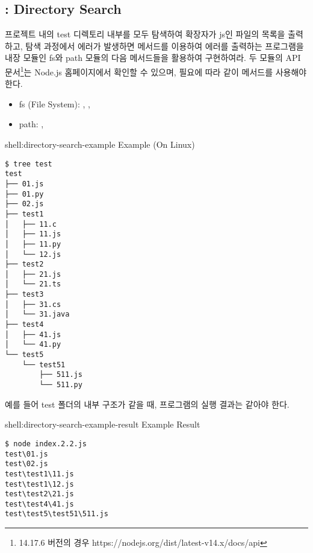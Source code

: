 \subsection*{: Directory Search}

프로젝트 내의 test 디렉토리 내부를 모두 탐색하여 확장자가 js인 파일의 목록을 출력하고, 탐색 과정에서 에러가 발생하면  메서드를 이용하여 에러를 출력하는 프로그램을 내장 모듈인 fs와 path 모듈의 다음 메서드들을 활용하여 구현하여라. 두 모듈의 API 문서\footnote{14.17.6 버전의 경우 https://nodejs.org/dist/latest-v14.x/docs/api}는 Node.js 홈페이지에서 확인할 수 있으며, 필요에 따라 \과 같이  메서드를 사용해야 한다.

\begin{itemize}
    \item fs (File System): , , 
    \item path: , 
\end{itemize}

\begin{shellenv}{shell:directory-search-example}{ Example (On Linux)}\begin{verbatim}
$ tree test
test
├── 01.js
├── 01.py
├── 02.js
├── test1
│   ├── 11.c
│   ├── 11.js
│   ├── 11.py
│   └── 12.js
├── test2
│   ├── 21.js
│   └── 21.ts
├── test3
│   ├── 31.cs
│   └── 31.java
├── test4
│   ├── 41.js
│   └── 41.py
└── test5
    └── test51
        ├── 511.js
        └── 511.py
\end{verbatim}
\end{shellenv}

예를 들어 test 폴더의 내부 구조가 \과 같을 때, 프로그램의 실행 결과는 \와 같아야 한다.

\begin{shellenv}{shell:directory-search-example-result}{ Example Result}\begin{verbatim}
$ node index.2.2.js
test\01.js
test\02.js
test\test1\11.js
test\test1\12.js
test\test2\21.js
test\test4\41.js
test\test5\test51\511.js
\end{verbatim}
\end{shellenv}
